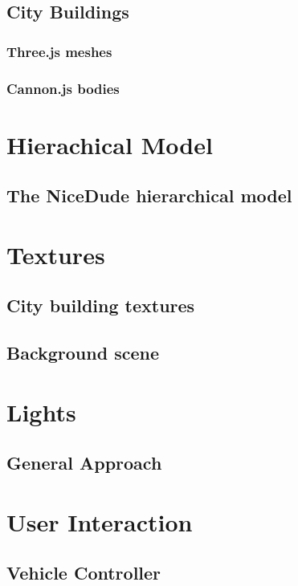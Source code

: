 \documentclass[a4paper,11pt, titlepage]{report}
\begin{document}
	\section{City Buildings}
		
		\subsection{Three.js meshes}
		
		\subsection{Cannon.js bodies}

\chapter{Hierachical Model}
	
	\section{The NiceDude hierarchical model}

\chapter{Textures}
	
	\section{City building textures}

	\section{Background scene}

\chapter{Lights}
	
	\section{General Approach}

\chapter{User Interaction}

	\section{Vehicle Controller}
\end{document}
